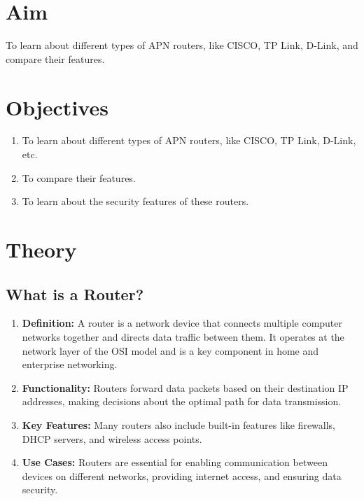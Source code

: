 \documentclass[11pt]{article}
\begin{document}
\tableofcontents
\thispagestyle{empty}
\clearpage

\setcounter{page}{1}

\section{Aim}
To learn about different types of APN routers, like CISCO, TP Link, D-Link, and
compare their features.

\section{Objectives}
\begin{enumerate}
  \item To learn about different types of APN routers, like CISCO, TP Link, D-Link,
        etc.
  \item To compare their features.
  \item To learn about the security features of these routers.
\end{enumerate}

\section{Theory}

\subsection{What is a Router?}
\begin{enumerate}
  \item \textbf{Definition:} A router is a network device that connects multiple computer networks together and directs data traffic between them. It operates at the network layer of the OSI model and is a key component in home and enterprise networking.

  \item \textbf{Functionality:} Routers forward data packets based on their destination IP addresses, making decisions about the optimal path for data transmission.

  \item \textbf{Key Features:} Many routers also include built-in features like firewalls, DHCP servers, and wireless access points.

  \item \textbf{Use Cases:} Routers are essential for enabling communication between devices on different networks, providing internet access, and ensuring data security.
\end{enumerate}
\end{document}
